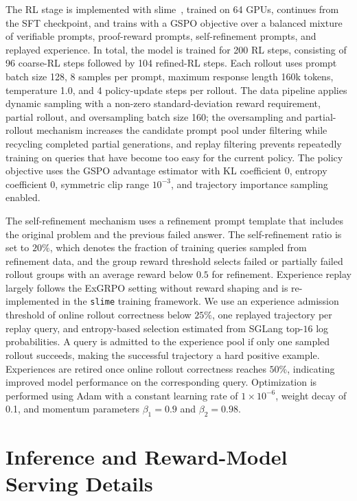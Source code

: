 \documentclass{llmxive}
\begin{document}
The RL stage is implemented with slime~\citep{thudm2026slime}, trained on 64 GPUs, continues from the SFT checkpoint, and trains with a GSPO objective over a balanced mixture of verifiable prompts, proof-reward prompts, self-refinement prompts, and replayed experience. In total, the model is trained for 200 RL steps, consisting of 96 coarse-RL steps followed by 104 refined-RL steps. Each rollout uses prompt batch size 128, 8 samples per prompt, maximum response length 160k tokens, temperature 1.0, and 4 policy-update steps per rollout. The data pipeline applies dynamic sampling with a non-zero standard-deviation reward requirement, partial rollout, and oversampling batch size 160; the oversampling and partial-rollout mechanism increases the candidate prompt pool under filtering while recycling completed partial generations, and replay filtering prevents repeatedly training on queries that have become too easy for the current policy. The policy objective uses the GSPO advantage estimator with KL coefficient 0, entropy coefficient 0, symmetric clip range $10^{-3}$, and trajectory importance sampling enabled. 

The self-refinement mechanism uses a refinement prompt template that includes the original problem and the previous failed answer. The self-refinement ratio is set to $20\%$, which denotes the fraction of training queries sampled from refinement data, and the group reward threshold selects failed or partially failed rollout groups with an average reward below $0.5$ for refinement. Experience replay largely follows the ExGRPO setting without reward shaping and is re-implemented in the \texttt{slime} training framework. We use an experience admission threshold of online rollout correctness below $25\%$, one replayed trajectory per replay query, and entropy-based selection estimated from SGLang top-$16$ log probabilities. A query is admitted to the experience pool if only one sampled rollout succeeds, making the successful trajectory a hard positive example. Experiences are retired once online rollout correctness reaches $50\%$, indicating improved model performance on the corresponding query. Optimization is performed using Adam with a constant learning rate of $1\times 10^{-6}$, weight decay of 0.1, and momentum parameters $\beta_1=0.9$ and $\beta_2=0.98$.

\section{Inference and Reward-Model Serving Details}
\label{app:inference-serving-details}
\end{document}
